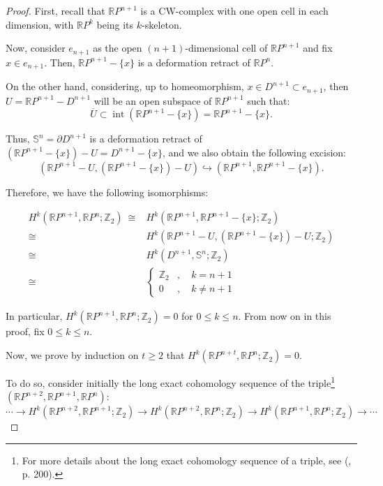 \documentclass[12pt,oneside]{book}
\newcommand{\RP}{\mathbb{R}P}
\newcommand{\Z}{\mathbb{Z}}
\begin{document}
    \begin{proof}
    
    First, recall that $\RP^{n+1}$ is a CW-complex with one open cell in each dimension, with $\RP^{k}$ being its 
    $k$-skeleton.
    
    Now, consider $e_{n+1}$ as the open $(n+1)$-dimensional cell of $\RP^{n+1}$ and fix $x\in e_{n+1}$. Then, $\RP^{n+1}-\{ x \}$ is a 
    deformation retract of $\RP^{n}$.
    
    On the other hand, considering, up to homeomorphism, $x\in D^{n+1}\subset e_{n+1}$, then $U=\RP^{n+1}-D^{n+1}$ will be an open subspace 
    of $\RP^{n+1}$ such that:
    $$ \overline{U}\subset \operatorname{int}(\RP^{n+1}-\{ x \})=\RP^{n+1}-\{ x \}. $$
    
    Thus, $\mathbb{S}^{n}=\partial D^{n+1}$ is a deformation retract of $(\RP^{n+1}-\{ x \})-U=D^{n+1}-\{ x \}$, and we also obtain the 
    following excision:
    $$ (\RP^{n+1}-U,(\RP^{n+1}-\{ x \})-U)\hookrightarrow (\RP^{n+1},\RP^{n+1}-\{ x \}). $$
    
    Therefore, we have the following isomorphisms:
    
    \[
    \begin{array}{rl}
    H^{k}(\RP^{n+1},\RP^{n};\Z_{2}) \ \cong & H^{k}(\RP^{n+1},\RP^{n+1}-\{ x \};\Z_{2}) \\[8pt]
    \cong & H^{k}(\RP^{n+1}-U,(\RP^{n+1}-\{ x \})-U;\Z_{2}) \\[8pt]
    \cong & H^{k}(D^{n+1},\mathbb{S}^{n};\Z_{2}) \\[8pt]
    \cong & \left\{
    \begin{array}{cl}
    \Z_{2} & ,\quad k=n+1 \\
    0      & ,\quad k\neq n+1
    \end{array}
    \right.
    \end{array}
    \]
    
    In particular, $H^{k}(\RP^{n+1},\RP^{n};\Z_{2})=0$ for $0\leq k\leq n$. From now on in this proof, fix $0\leq k\leq n$.
    
    Now, we prove by induction on $t\geq 2$ that $H^{k}(\RP^{n+t},\RP^{n};\Z_{2})=0$.
    
    To do so, consider initially the long exact cohomology sequence of the triple\footnote{For more details about the long exact cohomology 
    sequence of a triple, see (\cite{hatcher}, p. 200).} $(\RP^{n+2},\RP^{n+1},\RP^{n})$:
    $$ \cdots \to H^{k}(\RP^{n+2},\RP^{n+1};\Z_{2}) \to H^{k}(\RP^{n+2},\RP^{n};\Z_{2}) \to H^{k}(\RP^{n+1},\RP^{n};\Z_{2}) \to \cdots $$
    

\end{proof}
\end{document}
